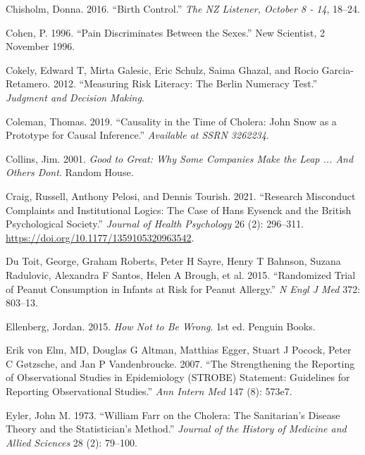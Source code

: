 \documentclass[
  10pt,
  b5paper]{book}
\newlength{\cslhangindent}
\newlength{\cslentryspacingunit} %
\newenvironment{CSLReferences}[2] %
 {%
  \setlength{\parindent}{0pt}
  \ifodd #1
  \let\oldpar\par
  \def\par{\hangindent=\cslhangindent\oldpar}
  \fi
  \setlength{\parskip}{#2\cslentryspacingunit}
 }%
 {}
\begin{document}
\begin{CSLReferences}{1}{0}
\leavevmode{}%
Chisholm, Donna. 2016. {``Birth Control.''} \emph{The NZ Listener, October 8 - 14}, 18--24.

\leavevmode{}%
Cohen, P. 1996. {``Pain Discriminates Between the Sexes.''} New Scientist, 2 November 1996.

\leavevmode{}%
Cokely, Edward T, Mirta Galesic, Eric Schulz, Saima Ghazal, and Rocio Garcia-Retamero. 2012. {``Measuring Risk Literacy: The Berlin Numeracy Test.''} \emph{Judgment and Decision Making}.

\leavevmode{}%
Coleman, Thomas. 2019. {``Causality in the Time of Cholera: John {S}now as a Prototype for Causal Inference.''} \emph{Available at SSRN 3262234}.

\leavevmode{}%
Collins, Jim. 2001. \emph{Good to Great: Why Some Companies Make the Leap ... And Others Dont}. Random House.

\leavevmode{}%
Craig, Russell, Anthony Pelosi, and Dennis Tourish. 2021. {``Research Misconduct Complaints and Institutional Logics: The Case of Hans Eysenck and the British Psychological Society.''} \emph{Journal of Health Psychology} 26 (2): 296--311. \url{https://doi.org/10.1177/1359105320963542}.

\leavevmode{}%
Du Toit, George, Graham Roberts, Peter H Sayre, Henry T Bahnson, Suzana Radulovic, Alexandra F Santos, Helen A Brough, et al. 2015. {``Randomized Trial of Peanut Consumption in Infants at Risk for Peanut Allergy.''} \emph{N Engl J Med} 372: 803--13.

\leavevmode{}%
Ellenberg, Jordan. 2015. \emph{How Not to Be Wrong}. 1st ed. Penguin Books.

\leavevmode{}%
Erik von Elm, MD, Douglas G Altman, Matthias Egger, Stuart J Pocock, Peter C Gøtzsche, and Jan P Vandenbroucke. 2007. {``The Strengthening the Reporting of Observational Studies in Epidemiology (STROBE) Statement: Guidelines for Reporting Observational Studies.''} \emph{Ann Intern Med} 147 (8): 573e7.

\leavevmode{}%
Eyler, John M. 1973. {``William Farr on the Cholera: The Sanitarian's Disease Theory and the Statistician's Method.''} \emph{Journal of the History of Medicine and Allied Sciences} 28 (2): 79--100.


\end{CSLReferences}
\end{document}
